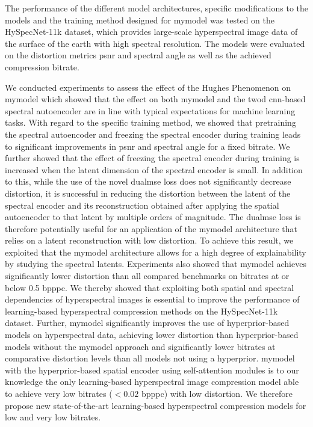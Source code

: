 The performance of the different model architectures, specific modifications to the models and the training method designed for \ac{mymodel} was tested on the HySpecNet-11k dataset, which provides large-scale hyperspectral image data of the surface of the earth with high spectral resolution. The models were evaluated on the distortion metrics \ac{psnr} and spectral angle as well as the achieved compression bitrate.

We conducted experiments to assess the effect of the Hughes Phenomenon on \ac{mymodel} which showed that the effect on both \ac{mymodel} and the \ac{twod} \ac{cnn}-based spectral autoencoder are in line with typical expectations for machine learning tasks. With regard to the specific training method, we showed that pretraining the spectral autoencoder and freezing the spectral encoder during training leads to significant improvements in \ac{psnr} and spectral angle for a fixed bitrate. We further showed that the effect of freezing the spectral encoder during training is increased when the latent dimension of the spectral encoder is small. In addition to this, while the use of the novel \ac{dualmse} loss does not significantly decrease distortion, it is successful in reducing the distortion between the latent of the spectral encoder and its reconstruction obtained after applying the spatial autoencoder to that latent by multiple orders of magnitude. The \ac{dualmse} loss is therefore potentially useful for an application of the \ac{mymodel} architecture that relies on a latent reconstruction with low distortion. To achieve this result, we exploited that the \ac{mymodel} architecture allows for a high degree of explainability by studying the spectral latents. Experiments also showed that \ac{mymodel} achieves significantly lower distortion than all compared benchmarks on bitrates at or below 0.5 bpppc. We thereby showed that exploiting both spatial and spectral dependencies of hyperspectral images is essential to improve the performance of learning-based hyperspectral compression methods on the HySpecNet-11k dataset. Further, \ac{mymodel} significantly improves the use of hyperprior-based models on hyperspectral data, achieving lower distortion than hyperprior-based models without the \ac{mymodel} approach and significantly lower bitrates at comparative distortion levels than all models not using a hyperprior. \ac{mymodel} with the hyperprior-based spatial encoder using self-attention modules is to our knowledge the only learning-based hyperspectral image compression model able to achieve very low bitrates ($<0.02$ \ac{bpppc}) with low distortion. We therefore propose new state-of-the-art learning-based hyperspectral compression models for low and very low bitrates.


